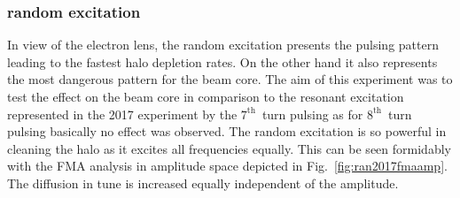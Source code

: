 \documentclass[%
 reprint,
 amsmath,amssymb,
 aps,
prstab,
]{revtex4-1}
\begin{document}
\subsubsection{random excitation\label{sec:simexran}}
In view of the electron lens, the random excitation presents the pulsing pattern leading to the fastest halo depletion rates. On the other hand it also represents the most dangerous pattern for the beam core. The aim of this experiment was to test the effect on the beam core in comparison to the resonant excitation represented in the 2017 experiment by the $7^{\mathrm{th}}$~turn pulsing as for $8^{\mathrm{th}}$~turn pulsing basically no effect was observed. The random excitation is so powerful in cleaning the halo as it excites all frequencies equally. This can be seen formidably with the FMA analysis in amplitude space depicted in Fig.~\ref{fig:ran2017fmaamp}. The diffusion in tune is increased equally independent of the amplitude.
\end{document}
